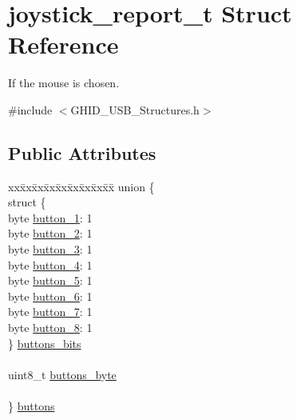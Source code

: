 \hypertarget{structjoystick__report__t}{\section{joystick\-\_\-report\-\_\-t \-Struct \-Reference}
\label{structjoystick__report__t}
}


\-If the mouse is chosen.  




{\ttfamily \#include $<$\-G\-H\-I\-D\-\_\-\-U\-S\-B\-\_\-\-Structures.\-h$>$}

\subsection*{\-Public \-Attributes}
\begin{DoxyCompactItemize}
\item 
\begin{tabbing}
xx\=xx\=xx\=xx\=xx\=xx\=xx\=xx\=xx\=\kill
union \{\\
\>struct \{\\
\>\>byte \hyperlink{structjoystick__report__t_a886edb5222b7c842f1c2f80e65cb301f}{button\_1}: 1\\
\>\>byte \hyperlink{structjoystick__report__t_af142ca63810131e6386b3bde9de28864}{button\_2}: 1\\
\>\>byte \hyperlink{structjoystick__report__t_ae2f9a864f5f3f93f8a2975542b019c81}{button\_3}: 1\\
\>\>byte \hyperlink{structjoystick__report__t_a6e6f89e0ae6bfa464e58e6cf13e58780}{button\_4}: 1\\
\>\>byte \hyperlink{structjoystick__report__t_a40d6ab0397fbb594304c624a03da1eed}{button\_5}: 1\\
\>\>byte \hyperlink{structjoystick__report__t_a962c2ec3124700193a5153f9efe862bd}{button\_6}: 1\\
\>\>byte \hyperlink{structjoystick__report__t_af93282ad1ac14cace7c2c1739b6d0998}{button\_7}: 1\\
\>\>byte \hyperlink{structjoystick__report__t_a26bd852e878a85aa8bfe428832cc8fe6}{button\_8}: 1\\
\>\} \hyperlink{structjoystick__report__t_aade536be4f91757b2ecd075fcf2f0a3d}{buttons\_bits}\\
\>\>\\
\>uint8\_t \hyperlink{structjoystick__report__t_a1b9fb1806c80f76292cba7c719ac6c6c}{buttons\_byte}\\
\>\>\\
\} \hyperlink{structjoystick__report__t_a653cada3bce72bb704999f5dc08faba2}{buttons}\\


\end{tabbing}
\end{DoxyCompactItemize}

